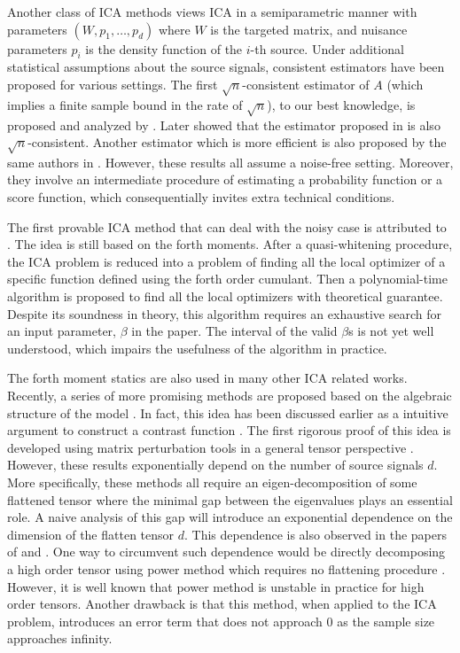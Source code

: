 \documentclass[twoside]{article}
\theoremstyle{definition}
\begin{document}
Another class of ICA methods views ICA in a semiparametric manner with parameters $(W, p_1, \ldots, p_d)$ where $W$ is the targeted matrix, and nuisance parameters $p_i$ is the density function of the $i$-th source. 
Under additional statistical assumptions about the source signals, consistent estimators have been proposed for various settings. The first  $\sqrt{n}$-consistent estimator of $A$ (which implies a finite sample bound in the rate of $\sqrt{n}$), to our best knowledge, is proposed and analyzed by \citet{samarov2004nonparametric}.  
Later \citet{chen2005consistent} showed that the estimator proposed in \citet{eriksson2003characteristic} is also $\sqrt{n}$-consistent. Another estimator which is more efficient is also proposed by the same authors in \citep{chen2006efficient}.
However, these results all assume a noise-free setting. 
Moreover, they involve an intermediate procedure of estimating a probability function or a score function, which consequentially invites extra technical conditions. 

The first provable ICA method that can deal with the noisy case is attributed to \citet{arora2012provable}. 
The idea is still based on the forth moments. 
After a quasi-whitening procedure, the ICA problem is reduced into a problem of finding all the local optimizer of a specific function defined using the forth order cumulant. Then a polynomial-time algorithm is proposed to find all the local optimizers with theoretical guarantee.
Despite its soundness in theory, this algorithm requires an exhaustive search for an input parameter, $\beta$ in the paper.
The interval of the valid $\beta$s is not yet well understood, which impairs the usefulness of the algorithm in practice.

The forth moment statics are also used in many other ICA related works. 
Recently, a series of more promising methods are proposed based on the algebraic structure of the model \citep{hsu2013learning,anandkumar2012tensordecomposition,anandkumar2012method}. 
In fact, this idea has been discussed earlier as a intuitive argument to construct a contrast function \citep{cardoso1999high}. 
The first rigorous proof of this idea is developed using matrix perturbation tools in a general tensor perspective \citep{anandkumar2012tensordecomposition,anandkumar2012method,goyal2014fourier}. 
However, these results exponentially depend on the number of source signals $d$.
More specifically, these methods all require an eigen-decomposition of some flattened tensor where the minimal gap between the eigenvalues plays an essential role. 
A naive analysis of this gap will introduce an exponential dependence on the dimension of the flatten tensor $d$. 
This dependence is also observed in the papers of \citet{cardoso1999high} and \citet{goyal2014fourier}.
One way to circumvent such dependence would be directly decomposing a high order tensor using power method which requires no flattening procedure \citep{anandkumar2014guaranteed}. 
However, it is well known that power method is unstable in practice for high order tensors. 
Another drawback is that this method, when applied to the ICA problem, introduces an error term that does not approach 0 as the sample size approaches infinity. 
\end{document}
